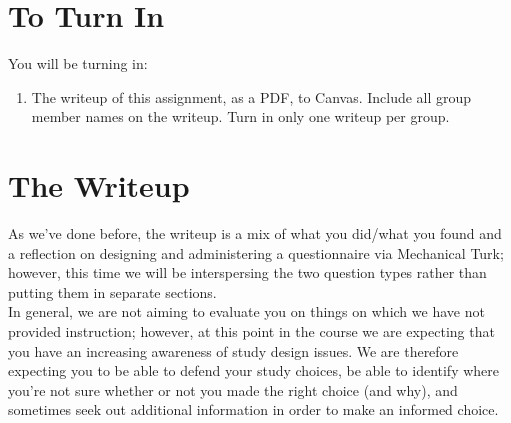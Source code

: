 \documentclass{article}
\begin{document}
\section{To Turn In}
You will be turning in:
\begin{enumerate}
    \item The writeup of this assignment, as a PDF, to Canvas. Include all group member names on the writeup. Turn in only one writeup per group. 
    
\end{enumerate}

\section{The Writeup}
As we've done before, the writeup is a mix of what you did/what you found and a reflection on designing and administering a questionnaire via Mechanical Turk; however, this time we will be interspersing the two question types rather than putting them in separate sections.\\

In general, we are not aiming to evaluate you on things on which we have not provided instruction; however, at this point in the course we are expecting that you have an increasing awareness of study design issues. We are therefore expecting you to be able to defend your study choices, be able to identify where you're not sure whether or not you made the right choice (and why), and sometimes seek out additional information in order to make an informed choice.
\end{document}

